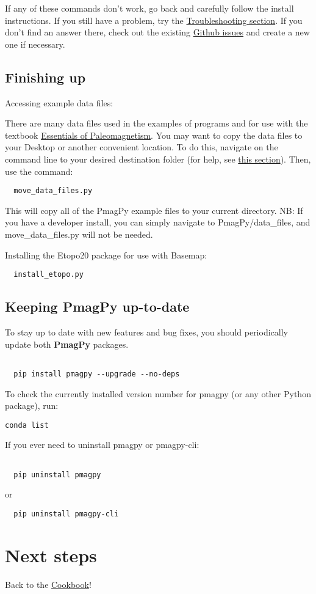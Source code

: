 \documentclass[11pt]{article}
\begin{document}
If any of these commands don't work, go back and carefully follow the install instructions.  If you still have a problem, try the \href{https://earthref.org/PmagPy/cookbook/#trouble}{Troubleshooting section}.  If you don't find an answer there, check out the existing \href{https://github.com/PmagPy/PmagPy/issues}{Github issues} and create a new one if necessary.


\subsection{Finishing up}

Accessing example data files:

   There are many data files used in the examples of programs and for use with the textbook  \href{http://earthref.org/MAGIC/books/Tauxe/Essentials/WebBook3.html}{Essentials of Paleomagnetism}.     You may want to copy  the data files to your Desktop or another convenient location.
   To do this, navigate on the command line to your desired destination folder (for help, see \href{https://earthref.org/PmagPy/cookbook/#file_system}{this section}).  Then, use the command:

\begin{verbatim}
  move_data_files.py
\end{verbatim}

This will copy all of the PmagPy example files to your current directory.  NB: If you have a developer install, you can simply navigate to PmagPy/data\_files, and move\_data\_files.py will not be needed.

Installing the Etopo20 package for use with Basemap:

\begin{verbatim}
  install_etopo.py
\end{verbatim}


\subsection{Keeping PmagPy up-to-date}


To stay up to date with new features and bug fixes, you should periodically update both {\bf PmagPy} packages.
\begin{verbatim}

  pip install pmagpy --upgrade --no-deps
\end{verbatim}

To check the currently installed version number for pmagpy (or any other Python package), run:
\begin{verbatim}
conda list
\end{verbatim}

If you ever need to uninstall pmagpy or pmagpy-cli:

\begin{verbatim}

  pip uninstall pmagpy
\end{verbatim}
  or
\begin{verbatim}
  pip uninstall pmagpy-cli
\end{verbatim}

\section{Next steps}

Back to the \href{https://earthref.org/PmagPy/cookbook/#next_steps}{Cookbook}!
\end{document}
